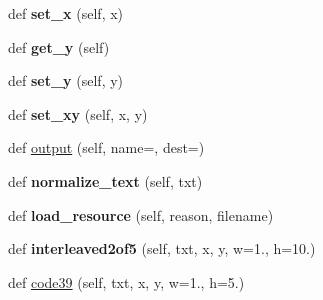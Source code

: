 \begin{DoxyCompactItemize}
\item 
def {\bfseries set\+\_\+x} (self, x)\hypertarget{class_libraries_1_1fpdf_1_1fpdf_1_1_f_p_d_f_a454160eee46d8f1bdbd3c169a4b45bf7}{}\label{class_libraries_1_1fpdf_1_1fpdf_1_1_f_p_d_f_a454160eee46d8f1bdbd3c169a4b45bf7}

\item 
def {\bfseries get\+\_\+y} (self)\hypertarget{class_libraries_1_1fpdf_1_1fpdf_1_1_f_p_d_f_a0d763e8edd37b2c6ee825d5d8a6ed3b4}{}\label{class_libraries_1_1fpdf_1_1fpdf_1_1_f_p_d_f_a0d763e8edd37b2c6ee825d5d8a6ed3b4}

\item 
def {\bfseries set\+\_\+y} (self, y)\hypertarget{class_libraries_1_1fpdf_1_1fpdf_1_1_f_p_d_f_a4c5791a10b5f9c84894855ad5b060702}{}\label{class_libraries_1_1fpdf_1_1fpdf_1_1_f_p_d_f_a4c5791a10b5f9c84894855ad5b060702}

\item 
def {\bfseries set\+\_\+xy} (self, x, y)\hypertarget{class_libraries_1_1fpdf_1_1fpdf_1_1_f_p_d_f_a6be93378ca20ef3301c5943adca42cf5}{}\label{class_libraries_1_1fpdf_1_1fpdf_1_1_f_p_d_f_a6be93378ca20ef3301c5943adca42cf5}

\item 
def \hyperlink{class_libraries_1_1fpdf_1_1fpdf_1_1_f_p_d_f_a1f348e025f70edb329f718dab0490aab}{output} (self, name=\textquotesingle{}\textquotesingle{}, dest=\textquotesingle{}\textquotesingle{})
\item 
def {\bfseries normalize\+\_\+text} (self, txt)\hypertarget{class_libraries_1_1fpdf_1_1fpdf_1_1_f_p_d_f_af530a539bf2f876fe1da38d04e68effd}{}\label{class_libraries_1_1fpdf_1_1fpdf_1_1_f_p_d_f_af530a539bf2f876fe1da38d04e68effd}

\item 
def {\bfseries load\+\_\+resource} (self, reason, filename)\hypertarget{class_libraries_1_1fpdf_1_1fpdf_1_1_f_p_d_f_a13532b0c47a1671f3bc2d2f185fb4f78}{}\label{class_libraries_1_1fpdf_1_1fpdf_1_1_f_p_d_f_a13532b0c47a1671f3bc2d2f185fb4f78}

\item 
def {\bfseries interleaved2of5} (self, txt, x, y, w=1., h=10.)\hypertarget{class_libraries_1_1fpdf_1_1fpdf_1_1_f_p_d_f_a9b8932a4af4ecf3542b718908ddd6d07}{}\label{class_libraries_1_1fpdf_1_1fpdf_1_1_f_p_d_f_a9b8932a4af4ecf3542b718908ddd6d07}

\item 
def \hyperlink{class_libraries_1_1fpdf_1_1fpdf_1_1_f_p_d_f_a8c492abc6860ad539bb0b270385302c4}{code39} (self, txt, x, y, w=1., h=5.)
\end{DoxyCompactItemize}
